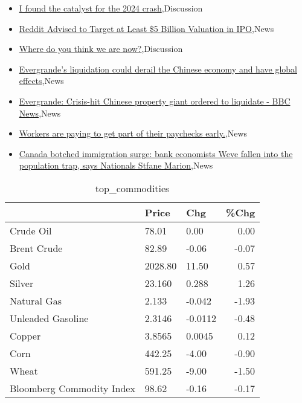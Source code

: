 \documentclass{article}%
\begin{document}
%
\begin{itemize}%
\item%
\href{https://reddit.com/r/StockMarket/comments/1ad9qme/i\_found\_the\_catalyst\_for\_the\_2024\_crash/}{I found the catalyst for the 2024 crash},Discussion%
\item%
\href{https://reddit.com/r/StockMarket/comments/1ad76rd/reddit\_advised\_to\_target\_at\_least\_5\_billion/}{Reddit Advised to Target at Least \$5 Billion Valuation in IPO},News%
\item%
\href{https://reddit.com/r/StockMarket/comments/1acpax3/where\_do\_you\_think\_we\_are\_now/}{Where do you think we are now?},Discussion%
\item%
\href{https://reddit.com/r/Economics/comments/1ado6nx/evergrandes\_liquidation\_could\_derail\_the\_chinese/}{Evergrande's liquidation could derail the Chinese economy and have global effects},News%
\item%
\href{https://reddit.com/r/Economics/comments/1adnx32/evergrande\_crisishit\_chinese\_property\_giant/}{Evergrande: Crisis-hit Chinese property giant ordered to liquidate - BBC News},News%
\item%
\href{https://reddit.com/r/Economics/comments/1adn4wd/workers\_are\_paying\_to\_get\_part\_of\_their\_paychecks/}{Workers are paying to get part of their paychecks early.},News%
\item%
\href{https://reddit.com/r/Economics/comments/1adehwo/canada\_botched\_immigration\_surge\_bank\_economists/}{Canada botched immigration surge: bank economists  Weve fallen into the population trap, says Nationals Stfane Marion},News%
\end{itemize}%


\begin{table}[htbp]%
\caption{top\_commodities}%
\centering%
\begin{adjustbox}{width=1\textwidth}%
\begin{tabular}{lllr}
\toprule
                          &   Price &     Chg &  \%Chg \\
\midrule
               Crude Oil  &   78.01 &    0.00 &  0.00 \\
             Brent Crude  &   82.89 &   -0.06 & -0.07 \\
                    Gold  & 2028.80 &   11.50 &  0.57 \\
                  Silver  &  23.160 &   0.288 &  1.26 \\
             Natural Gas  &   2.133 &  -0.042 & -1.93 \\
       Unleaded Gasoline  &  2.3146 & -0.0112 & -0.48 \\
                  Copper  &  3.8565 &  0.0045 &  0.12 \\
                    Corn  &  442.25 &   -4.00 & -0.90 \\
                   Wheat  &  591.25 &   -9.00 & -1.50 \\
Bloomberg Commodity Index &   98.62 &   -0.16 & -0.17 \\
\bottomrule
\end{tabular}
%
\end{adjustbox}%
\end{table}
\end{document}
